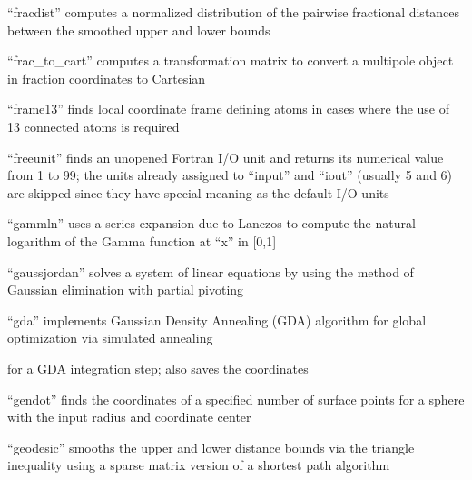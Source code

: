 \documentclass[letterpaper,11pt,english]{sphinxmanual}
\begin{document}

“fracdist” computes a normalized distribution of the pairwise
fractional distances between the smoothed upper and lower bounds


“frac\_to\_cart” computes a transformation matrix to convert
a multipole object in fraction coordinates to Cartesian


“frame13” finds local coordinate frame defining atoms in cases
where the use of 1\sphinxhyphen{}3 connected atoms is required


“freeunit” finds an unopened Fortran I/O unit and returns
its numerical value from 1 to 99; the units already assigned
to “input” and “iout” (usually 5 and 6) are skipped since
they have special meaning as the default I/O units


“gammln” uses a series expansion due to Lanczos to compute
the natural logarithm of the Gamma function at “x” in {[}0,1{]}


“gaussjordan” solves a system of linear equations by using
the method of Gaussian elimination with partial pivoting


“gda” implements Gaussian Density Annealing (GDA) algorithm
for global optimization via simulated annealing





for a GDA integration step; also saves the coordinates


“gendot” finds the coordinates of a specified number of surface
points for a sphere with the input radius and coordinate center


“geodesic” smooths the upper and lower distance bounds via
the triangle inequality using a sparse matrix version of a
shortest path algorithm
\end{document}
